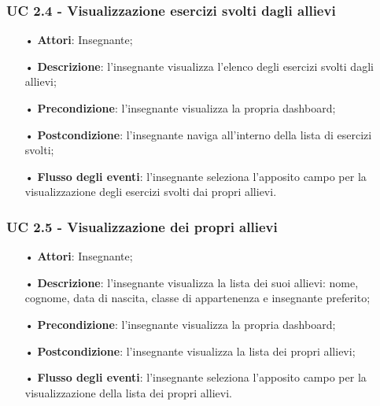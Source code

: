 \subsubsection{UC 2.4 - Visualizzazione esercizi svolti dagli allievi}
\begin{itemize}
	\item[•] \textbf{Attori}: Insegnante;
	\item[•] \textbf{Descrizione}:  l'insegnante visualizza l'elenco degli esercizi svolti dagli allievi;
	\item[•] \textbf{Precondizione}: l'insegnante visualizza la propria dashboard;
	\item[•] \textbf{Postcondizione}: l'insegnante naviga all'interno della lista di esercizi svolti;
	\item[•] \textbf{Flusso degli eventi}: l'insegnante seleziona l'apposito campo per la visualizzazione degli esercizi svolti dai propri allievi.
\end{itemize}

\subsubsection{UC 2.5 - Visualizzazione dei propri allievi}
\begin{itemize}
	\item[•] \textbf{Attori}: Insegnante;
	\item[•] \textbf{Descrizione}: l'insegnante visualizza la lista dei suoi allievi: nome, cognome, data di nascita, classe di appartenenza e insegnante preferito;
	\item[•] \textbf{Precondizione}: l'insegnante visualizza la propria dashboard;
	\item[•] \textbf{Postcondizione}: l'insegnante visualizza la lista dei propri allievi;
	\item[•] \textbf{Flusso degli eventi}:  l'insegnante seleziona l'apposito campo per la visualizzazione della lista dei propri allievi.
\end{itemize}



